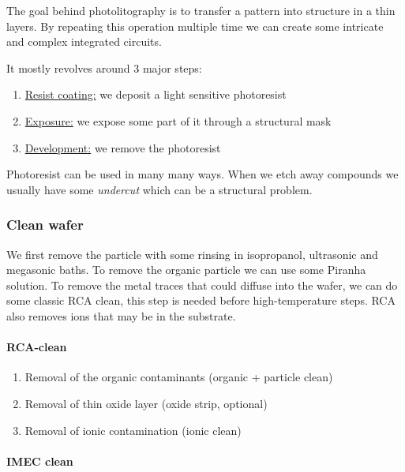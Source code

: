 \documentclass[
]{article}
\begin{document}
The goal behind photolitography is to transfer a pattern into structure
in a thin layers. By repeating this operation multiple time we can
create some intricate and complex integrated circuits.

It mostly revolves around 3 major steps:

\begin{enumerate}
\def\labelenumi{\arabic{enumi}.}
\item
  \ul{Resist coating:} we deposit a light sensitive photoresist
\item
  \ul{Exposure:} we expose some part of it through a structural mask
\item
  \ul{Development:} we remove the photoresist
\end{enumerate}

Photoresist can be used in many many ways. When we etch away compounds
we usually have some \emph{undercut} which can be a structural problem.

\hypertarget{clean-wafer}{%
\subsubsection{Clean wafer}\label{clean-wafer}}

We first remove the particle with some rinsing in isopropanol,
ultrasonic and megasonic baths. To remove the organic particle we can
use some Piranha solution. To remove the metal traces that could diffuse
into the wafer, we can do some classic RCA clean, this step is needed
before high-temperature steps. RCA also removes ions that may be in the
substrate.

\hypertarget{rca-clean}{%
\paragraph{RCA-clean}\label{rca-clean}}

\begin{enumerate}
\def\labelenumi{\arabic{enumi}.}
\item
  Removal of the organic contaminants (organic + particle clean)
\item
  Removal of thin oxide layer (oxide strip, optional)
\item
  Removal of ionic contamination (ionic clean)
\end{enumerate}

\hypertarget{imec-clean}{%
\paragraph{IMEC clean}\label{imec-clean}}
\end{document}
